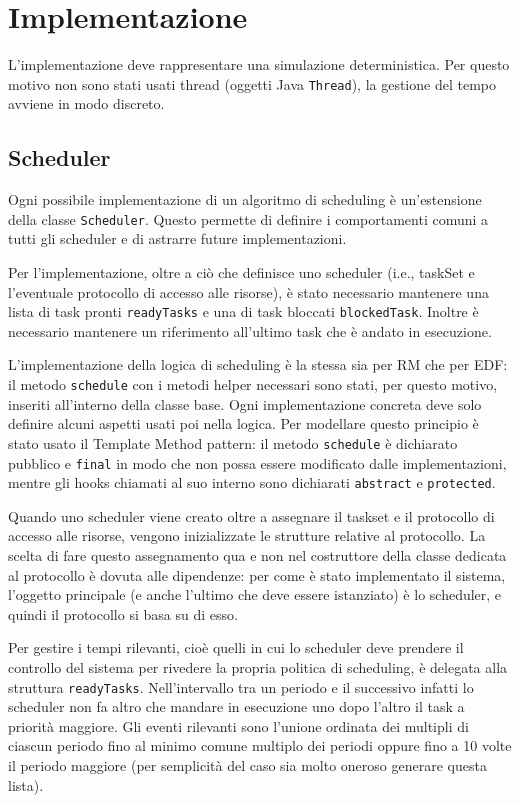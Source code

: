 \chapter{Implementazione}
\label{cap:implementazione}
L'implementazione deve rappresentare una simulazione deterministica. Per questo motivo non sono stati usati thread (oggetti Java \texttt{Thread}), la gestione del tempo avviene in modo discreto.

\section{Scheduler}
Ogni possibile implementazione di un algoritmo di scheduling è un'estensione della classe \texttt{Scheduler}. Questo permette di definire i comportamenti comuni a tutti gli scheduler e di astrarre future implementazioni.

Per l'implementazione, oltre a ciò che definisce uno scheduler (i.e., taskSet e l'eventuale protocollo di accesso alle risorse), è stato necessario mantenere una lista di task pronti \texttt{readyTasks} e una di task bloccati \texttt{blockedTask}. Inoltre è necessario mantenere un riferimento all'ultimo task che è andato in esecuzione.

\myskip

L'implementazione della logica di scheduling è la stessa sia per RM che per EDF: il metodo \texttt{schedule} con i metodi helper necessari sono stati, per questo motivo, inseriti all'interno della classe base. Ogni implementazione concreta deve solo definire alcuni aspetti usati poi nella logica. Per modellare questo principio è stato usato il Template Method pattern: il metodo \texttt{schedule} è dichiarato pubblico e \texttt{final} in modo che non possa essere modificato dalle implementazioni, mentre gli hooks chiamati al suo interno sono dichiarati \texttt{abstract} e \texttt{protected}.

\myskip

Quando uno scheduler viene creato oltre a assegnare il taskset e il protocollo di accesso alle risorse, vengono inizializzate le strutture relative al protocollo. La scelta di fare questo assegnamento qua e non nel costruttore della classe dedicata al protocollo è dovuta alle dipendenze: per come è stato implementato il sistema, l'oggetto principale (e anche l'ultimo che deve essere istanziato) è lo scheduler, e quindi il protocollo si basa su di esso.

Per gestire i tempi rilevanti, cioè quelli in cui lo scheduler deve prendere il controllo del sistema per rivedere la propria politica di scheduling, è delegata alla struttura \texttt{readyTasks}. Nell'intervallo tra un periodo e il successivo infatti lo scheduler non fa altro che mandare in esecuzione uno dopo l'altro il task a priorità maggiore. Gli eventi rilevanti sono l'unione ordinata dei multipli di ciascun periodo fino al minimo comune multiplo dei periodi oppure fino a 10 volte il periodo maggiore (per semplicità del caso sia molto oneroso generare questa lista).

